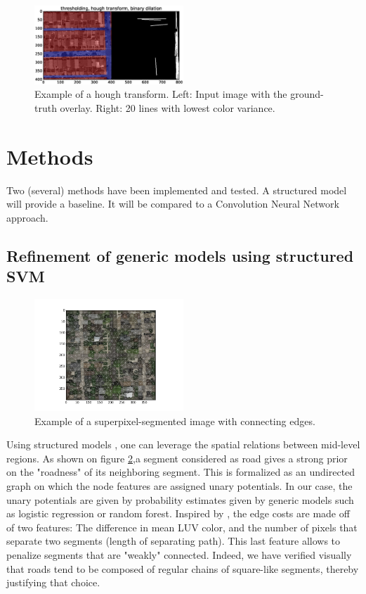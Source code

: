 \documentclass[10pt,conference,compsocconf]{IEEEtran}
\begin{document}
\begin{figure}[htb]
\centering
\includegraphics[width=0.5\textwidth]{pics/ex_hough.eps}
\caption{\label{fig:orgparagraph1}
Example of a hough transform. Left: Input image with the ground-truth overlay. Right: 20 lines with lowest color variance.}
\end{figure}
\section{Methods}
\label{sec:orgheadline12}
Two (several) methods have been implemented and tested. A structured model will provide a baseline. It will be compared to a Convolution Neural Network approach.
\subsection{Refinement of generic models using structured SVM}
\label{sec:orgheadline11}
\begin{figure}[htb]
\centering
\includegraphics[width=0.5\textwidth]{pics/ex_graph.png}
\caption{\label{fig:orgparagraph2}
Example of a superpixel-segmented image with connecting edges.}
\end{figure}

   Using structured models \cite{tsochantaridis05}, one can leverage the spatial relations between mid-level regions. As shown on figure \ref{fig:orgparagraph2},a segment considered as road gives a strong prior on the "roadness" of its neighboring segment. This is formalized as an undirected graph on which the node features are assigned unary potentials. In our case, the unary potentials are given by probability estimates given by generic models such as logistic regression or random forest.
Inspired by \cite{fulkerson09}, the edge costs are made off of two features: The difference in mean LUV color, and the number of pixels that separate two segments (length of separating path). This last feature allows to penalize segments that are "weakly" connected. Indeed, we have verified visually that roads tend to be composed of regular chains of square-like segments, thereby justifying that choice.
\end{document}
